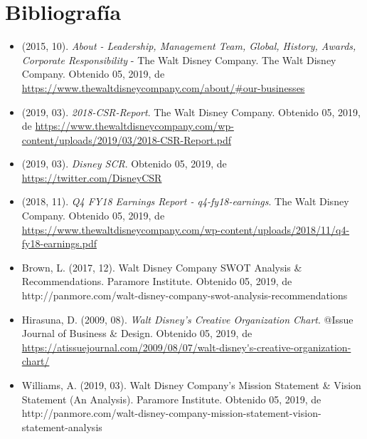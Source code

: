 \section{Bibliografía}

\begin{itemize}

\item
(2015, 10). \textit{About - Leadership, Management Team, Global, History, Awards, Corporate Responsibility} - The Walt Disney Company. The Walt Disney Company. Obtenido 05, 2019, de \url{https://www.thewaltdisneycompany.com/about/#our-businesses}

\item
(2019, 03). \textit{2018-CSR-Report}. The Walt Disney Company. Obtenido 05, 2019, de \url{https://www.thewaltdisneycompany.com/wp-content/uploads/2019/03/2018-CSR-Report.pdf}

\item
(2019, 03). \textit{Disney SCR}. Obtenido 05, 2019, de \url{https://twitter.com/DisneyCSR}

\item
(2018, 11). \textit{Q4 FY18 Earnings Report - q4-fy18-earnings}. The Walt Disney Company. Obtenido 05, 2019, de \url{https://www.thewaltdisneycompany.com/wp-content/uploads/2018/11/q4-fy18-earnings.pdf}

\item
Brown, L. (2017, 12). Walt Disney Company SWOT Analysis & Recommendations. Paramore Institute. Obtenido 05, 2019, de http://panmore.com/walt-disney-company-swot-analysis-recommendations

\item
Hirasuna, D. (2009, 08). \textit{Walt Disney’s Creative Organization Chart}. @Issue Journal of Business \& Design. Obtenido 05, 2019, de \url{https://atissuejournal.com/2009/08/07/walt-disney's-creative-organization-chart/}

\item
Williams, A. (2019, 03). Walt Disney Company’s Mission Statement \& Vision Statement (An Analysis). Paramore Institute. Obtenido 05, 2019, de http://panmore.com/walt-disney-company-mission-statement-vision-statement-analysis


\end{itemize}